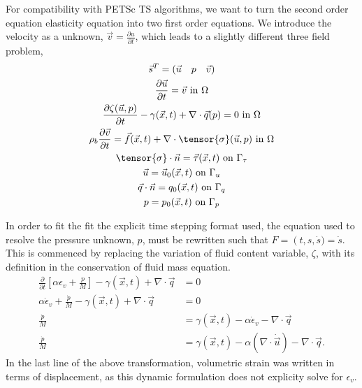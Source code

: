 For compatibility with PETSc TS algorithms, we want to turn the second
order equation elasticity equation into two first order equations. We
introduce the velocity as a unknown,
$\vec{v}=\frac{\partial u}{\partial t}$, which leads to a slightly
different three field problem,
\begin{gather}
\vec{s}^{T} = \left(\vec{u} \quad p \quad \vec{v}\right) \\
\frac{\partial \vec{u}}{\partial t} = \vec{v} \text{ in } \Omega \\
\frac{\partial \zeta(\vec{u},p)}{\partial t } - \gamma(\vec{x},t) + \nabla \cdot \vec{q}(p) = 0 \text{ in } \Omega \\
\rho_{b} \frac{\partial \vec{v}}{\partial t} = \vec{f}(\vec{x},t) + \nabla \cdot \tensor{\sigma}(\vec{u},p) \text{ in } \Omega \\
\tensor{\sigma} \cdot \vec{n} = \vec{\tau}(\vec{x},t) \text{ on } \Gamma_{\tau} \\
\vec{u} = \vec{u}_{0}(\vec{x}, t) \text{ on } \Gamma_{u} \\
\vec{q} \cdot \vec{n} = q_{0}(\vec{x}, t) \text{ on } \Gamma_{q} \\
p = p_{0}(\vec{x},t) \text{ on } \Gamma_{p}
\end{gather}

In order to fit the fit the explicit time stepping format used, the equation used to resolve the pressure
unknown, $p$, must be rewritten such that $F = \left(t,s,\dot{s}) = \dot{s}$. This is commenced by
replacing the variation of fluid content variable, $\zeta$, with its definition in the conservation of fluid mass equation.
\begin{align}
    \frac{\partial}{\partial t}\left[\alpha \epsilon_{v} + \frac{p}{M}\right] - \gamma\left(\vec{x},t\right) + \nabla \cdot \vec{q} &= 0 \\
    \alpha \dot{\epsilon}_{v} + \frac{\dot{p}}{M} - \gamma \left(\vec{x},t\right) + \nabla \cdot \vec{q} &= 0 \\
    \frac{\dot{p}}{M} &= \gamma \left(\vec{x},t \right) - \alpha \dot{\epsilon}_{v} -\nabla \cdot \vec{q} \\
    \frac{\dot{p}}{M} &= \gamma \left(\vec{x},t \right) - \alpha \left( \nabla \cdot \dot{\vec{u}} \right) -\nabla \cdot \vec{q}.
\end{align}
In the last line of the above transformation, volumetric strain
was written in terms of displacement, as this dynamic formulation does not explicity solve
for $\epsilon_{v}$.

